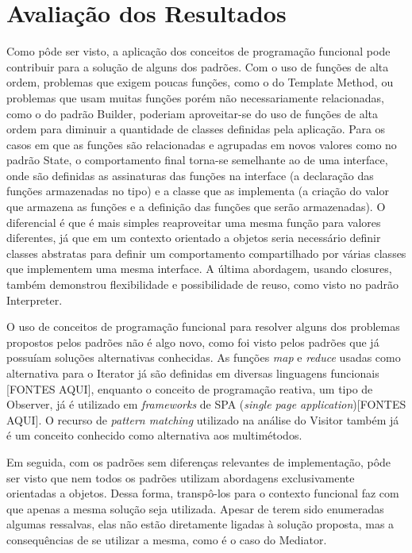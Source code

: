 \section{Avaliação dos Resultados}

Como pôde ser visto, a aplicação dos 
conceitos de programação funcional pode 
contribuir para a solução de alguns dos padrões. 
Com o uso de funções de alta ordem, problemas 
que exigem poucas funções, como o do Template 
Method, ou problemas que usam muitas funções 
porém não necessariamente relacionadas, como 
o do padrão Builder, poderiam aproveitar-se do 
uso de funções de alta ordem para diminuir a 
quantidade de classes definidas pela 
aplicação. Para os casos em que as funções 
são relacionadas e agrupadas em 
novos valores como no padrão State, 
o comportamento final torna-se semelhante 
ao de uma interface, onde são definidas 
as assinaturas das funções na interface 
(a declaração das funções armazenadas 
no tipo) e a classe que as implementa 
(a criação do valor que armazena as 
funções e a definição das funções que 
serão armazenadas). O diferencial é que 
é mais simples reaproveitar uma mesma 
função para valores diferentes, já que 
em um contexto orientado a objetos seria 
necessário definir classes abstratas 
para definir um comportamento compartilhado 
por várias classes que implementem uma 
mesma interface.
A última abordagem, usando closures, também 
demonstrou flexibilidade e possibilidade 
de reuso, como visto no padrão Interpreter. 

O uso de conceitos de programação funcional 
para resolver alguns dos problemas propostos 
pelos padrões não é algo novo, como foi visto 
pelos padrões que já possuíam soluções alternativas 
conhecidas. As funções \textit{map} e \textit{reduce} 
usadas como alternativa para o Iterator já 
são definidas em diversas linguagens funcionais
[FONTES AQUI], 
enquanto o conceito de programação reativa, 
um tipo de Observer, já é 
utilizado em \textit{frameworks} de SPA 
(\textit{single page application})[FONTES AQUI]. 
O recurso de \textit{pattern matching} 
utilizado na análise do Visitor também já 
é um conceito conhecido como alternativa 
aos multimétodos.

Em seguida, com os padrões sem diferenças 
relevantes de implementação, pôde ser visto 
que nem todos os padrões utilizam abordagens 
exclusivamente orientadas a objetos. Dessa forma, 
transpô-los para o contexto funcional faz com 
que apenas a mesma solução seja utilizada. 
Apesar de terem sido enumeradas algumas 
ressalvas, elas não estão diretamente ligadas 
à solução proposta, mas a consequências de 
se utilizar a mesma, como é o caso do Mediator. 

